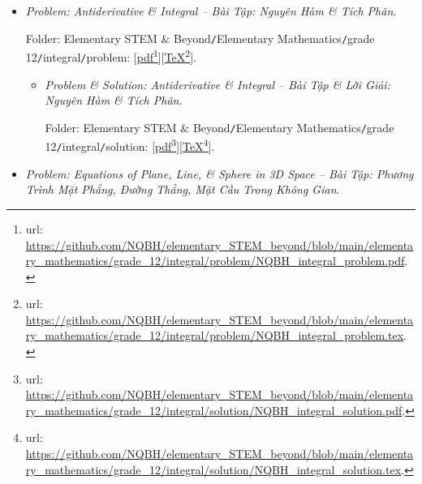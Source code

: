 \documentclass[12pt]{article}
\begin{document}
\begin{itemize}
\begin{itemize}
		Folder: {\sf Elementary STEM \& Beyond{\tt/}Elementary Mathematics{\tt/}grade 12{\tt/}statistical sample{\tt/}solution}: [\href{https://github.com/NQBH/elementary_STEM_beyond/blob/main/elementary_mathematics/grade_12/statistical_sample/solution/NQBH_probability_statistics_solution.pdf}{pdf}\footnote{{\sc url}: \url{https://github.com/NQBH/elementary_STEM_beyond/blob/main/elementary_mathematics/grade_12/statistical_sample/solution/NQBH_probability_statistics_solution.pdf}.}][\href{https://github.com/NQBH/elementary_STEM_beyond/blob/main/elementary_mathematics/grade_12/statistical_sample/solution/NQBH_probability_statistics_solution.tex}{\TeX}\footnote{{\sc url}: \url{https://github.com/NQBH/elementary_STEM_beyond/blob/main/elementary_mathematics/grade_12/statistical_sample/solution/NQBH_probability_statistics_solution.tex}.}].
	\end{itemize}
	\item {\it Problem: Antiderivative \& Integral -- Bài Tập: Nguyên Hàm \& Tích Phân}.
	
	Folder: {\sf Elementary STEM \& Beyond{\tt/}Elementary Mathematics{\tt/}grade 12{\tt/}integral{\tt/}problem}: [\href{https://github.com/NQBH/elementary_STEM_beyond/blob/main/elementary_mathematics/grade_12/integral/problem/NQBH_integral_problem.pdf}{pdf}\footnote{{\sc url}: \url{https://github.com/NQBH/elementary_STEM_beyond/blob/main/elementary_mathematics/grade_12/integral/problem/NQBH_integral_problem.pdf}.}][\href{https://github.com/NQBH/elementary_STEM_beyond/blob/main/elementary_mathematics/grade_12/integral/problem/NQBH_integral_problem.tex}{\TeX}\footnote{{\sc url}: \url{https://github.com/NQBH/elementary_STEM_beyond/blob/main/elementary_mathematics/grade_12/integral/problem/NQBH_integral_problem.tex}.}].
	\begin{itemize}
		\item {\it Problem \& Solution: Antiderivative \& Integral -- Bài Tập \& Lời Giải: Nguyên Hàm \& Tích Phân}.
		
		Folder: {\sf Elementary STEM \& Beyond{\tt/}Elementary Mathematics{\tt/}grade 12{\tt/}integral{\tt/}solution}: [\href{https://github.com/NQBH/elementary_STEM_beyond/blob/main/elementary_mathematics/grade_12/integral/solution/NQBH_integral_solution.pdf}{pdf}\footnote{{\sc url}: \url{https://github.com/NQBH/elementary_STEM_beyond/blob/main/elementary_mathematics/grade_12/integral/solution/NQBH_integral_solution.pdf}.}][\href{https://github.com/NQBH/elementary_STEM_beyond/blob/main/elementary_mathematics/grade_12/integral/solution/NQBH_integral_solution.tex}{\TeX}\footnote{{\sc url}: \url{https://github.com/NQBH/elementary_STEM_beyond/blob/main/elementary_mathematics/grade_12/integral/solution/NQBH_integral_solution.tex}.}].
	\end{itemize}
	\item {\it Problem: Equations of Plane, Line, {\it\&} Sphere in 3D Space -- Bài Tập: Phương Trình Mặt Phẳng, Đường Thẳng, Mặt Cầu Trong Không Gian}.
	

\end{itemize}
\end{document}
